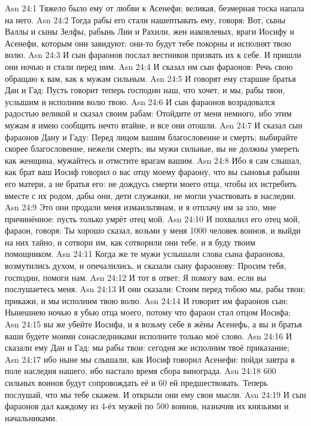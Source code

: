 \vs Asn 24:1
Тяжело было ему от любви к Асенефи; великая, безмерная тоска
напала на него.
\vs Asn 24:2
Тогда рабы его стали нашептывать ему, говоря: Вот, сыны Валлы
и сыны Зелфы, рабынь Лии и Рахили, жен иаковлевых, враги Иосифу и Асенефи,
которым они завидуют: они-то будут тебе покорны и исполнят твою волю.
\vs Asn 24:3
И сын фараонов послал вестников призвать их к себе. И пришли
они ночью и стали перед ним.
\vs Asn 24:4
И сказал им сын фараонов: Речь свою обращаю к вам, как к
мужам сильным.
\vs Asn 24:5
И говорят ему старшие братья Дан и Гад: Пусть говорит теперь
господин наш, что хочет, и мы, рабы твои, услышим и исполним волю твою.
\vs Asn 24:6
И сын фараонов возрадовался радостью великой и сказал своим
рабам: Отойдите от меня немного, ибо этим мужам я имею сообщить нечто втайне,
и все они отошли.
\vs Asn 24:7
И сказал сын фараонов Дану и Гаду: Перед лицом вашим
благословение и смерть; выбирайте скорее благословение, нежели смерть; вы
мужи сильные, вы не должны умереть как женщина, мужайтесь и отмстите врагам
вашим.
\vs Asn 24:8
Ибо я сам слышал, как брат ваш Иосиф говорил о вас отцу моему
фараону, что вы сыновья рабыни его матери, а не братья его: не дождусь смерти
моего отца, чтобы их истребить вместе с их родом, дабы они, дети служанки, не
могли участвовать в наследии.
\vs Asn 24:9
Это они продали меня измаильтянам, и я отплачу им за зло, мне
причинённое: пусть только умрёт отец мой.
\vs Asn 24:10
И похвалил его отец мой, фараон, говоря: Ты хорошо сказал,
возьми у меня 1000 человек воинов, и выйди на них тайно, и сотвори им, как
сотворили они тебе, и я буду твоим помощником.
\vs Asn 24:11
Когда же те мужи услышали
слова сына фараонова, возмутились духом, и опечалились, и сказали сыну
фараонову: Просим тебя, господин, помоги нам.
\vs Asn 24:12
И тот в ответ: Я помогу
вам, если вы послушаетесь меня.
\vs Asn 24:13
И они сказали: Стоим перед
тобою мы, рабы твои; прикажи, и мы исполним твою волю.
\vs Asn 24:14
И говорит им фараонов сын:
Нынешнею ночью я убью отца моего, потому что фараон стал отцом Иосифа;
\vs Asn 24:15
вы же убейте Иосифа, и я
возьму себе в жёны Асенефь, а вы и братья ваши будете моими сонаследниками
исполните только моё слово.
\vs Asn 24:16
И сказали ему Дан и Гад:
мы рабы твои: сегодня же исполним твоё приказание;
\vs Asn 24:17
ибо ныне мы слышали, как
Иосиф говорил Асенефи: пойди завтра в поле наследия нашего, ибо настало время
сбора винограда.
\vs Asn 24:18
600 сильных воинов
будут сопровождать её и 60 ей предшествовать. Теперь послушай, что мы
тебе скажем. И открыли они ему свои мысли.
\vs Asn 24:19
И сын фараонов дал каждому
из 4-ёх мужей по 500 воинов, назначив их князьями и начальниками.
